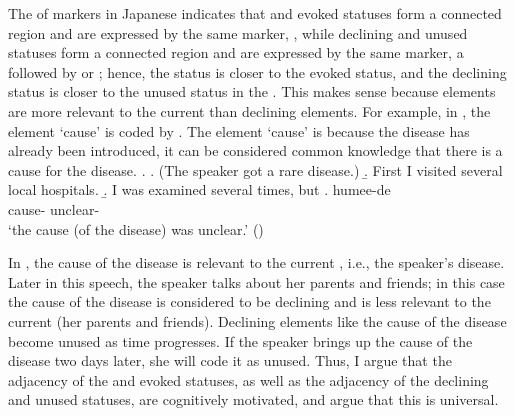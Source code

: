 The  of  markers in Japanese indicates that
 and evoked statuses form a connected region and are expressed by the same marker, ,
while declining and unused statuses form a connected region and are expressed by the same marker, a  followed by  or ;
hence, the  status is closer to the evoked status, and the declining status is closer to the unused status in the .
This makes sense because  elements are more relevant to
the current  than declining elements.
For example, in \Next,
the  element  `cause' is coded by .
The element `cause' is  because the disease has already been introduced, it can be considered common knowledge that there is a cause for the disease.
%
\ex.
 \a. (The speaker got a rare disease.)
 \b. First I visited several local hospitals.
 \b. I was examined several times, but
 \bg.  humee-de \\
   cause- unclear- \\
   `the cause (of the disease) was unclear.'
   \hfill{()}
%

In \Last,
the cause of the disease is relevant to the current , i.e., the speaker's disease.
Later in this speech,
the speaker talks about her parents and friends;
in this case the cause of the disease is considered to be declining and is less relevant to the current  (her parents and friends).
Declining elements like the cause of the disease become unused as time progresses.
If the speaker brings up the cause of the disease two days later,
she will code it as unused.
Thus, I argue that the adjacency of the  and evoked statuses, as well as the adjacency of the declining and unused statuses, are cognitively motivated, and argue that this is universal.

